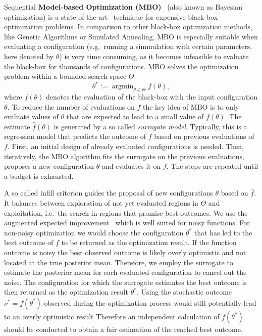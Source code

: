 \documentclass[bimj,fleqn]{w-art}
\theoremstyle{plain}
\theoremstyle{definition}
\begin{document}
Sequential \textbf{Model-based Optimization (MBO)}~\citep{jones_taxonomy_2001} (also known as Bayesian optimization) is a state-of-the-art~\citep{shahriari_taking_2016} technique for expensive black-box optimization problems.
In comparison to other black-box optimization methods, like Genetic Algorithms or Simulated Annealing, MBO is especially suitable when evaluating a configuration (e.g.\ running a simmulation with certain parameters, here denoted by $\theta$) is very time consuming, as it becomes infeasible to evaluate the black-box for thousands of configurations.
MBO solves the optimization problem within a bounded search space $\Theta$:
\[
\theta^\ast := \operatorname{argmin}_{\theta \in \Theta} f(\theta),
\]
where $f(\theta)$ denotes the evaluation of the black-box with the input configuration $\theta$.
To reduce the number of evaluations on $f$ the key idea of MBO is to only evaluate values of $\theta$ that are expected to lead to a small value of $f(\theta)$.
The estimate $\hat{f}(\theta)$ is generated by a so called \emph{surrogate model}.
Typically, this is a regression model that predicts the outcome of $f$ based on previous evaluations of $f$.
First, an initial design of already evaluated configurations is needed.
Then, iteratively, the MBO algorithm fits the surrogate on the previous evaluations, proposes a new configuration $\theta$ and evaluates it on $f$.
The steps are repeated until a budget is exhausted.

A so called infill criterion guides the proposal of new configurations $\theta$ based on $\hat{f}$.
It balances between exploration of not yet evaluated regions in $\Theta$ and exploitation, i.e.\ the search in regions that promise best outcomes.
We use the augmented expected improvement~\citep{huang_global_2006} which is well suited for noisy functions.
For non-noisy optimization we would choose the configuration $\theta^\ast$ that has led to the best outcome of $f$ to be returned as the optimization result.
If the function outcome is noisy the best observed outcome is likely overly optimistic and not located at the true posterior mean.
Therefore, we employ the surrogate to estimate the posterior mean for each evaluated configuration to cancel out the noise.
The configuration for which the surrogate estimates the best outcome is then returned as the optimization result $\theta^\ast$.
Using the stochastic outcome $\nu^\ast = f(\theta^\ast)$ observed during the optimization process would still potentially lead to an overly optimistic result
Therefore an independent calculation of $f(\theta^\ast)$ should be conducted to obtain a fair estimation of the reached best outcome.
\end{document}

